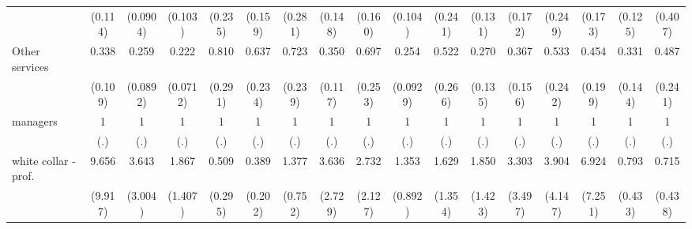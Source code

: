 {\begin{tabular}{l*{16}{c}}
                    &     (0.114)         &    (0.0904)         &     (0.103)         &     (0.235)         &     (0.159)         &     (0.281)         &     (0.148)         &     (0.160)         &     (0.104)         &     (0.241)         &     (0.131)         &     (0.172)         &     (0.249)         &     (0.173)         &     (0.125)         &     (0.407)         \\
[1em]
Other services      &       0.338\sym{***}&       0.259\sym{***}&       0.222\sym{***}&       0.810         &       0.637         &       0.723         &       0.350\sym{**} &       0.697         &       0.254\sym{***}&       0.522         &       0.270\sym{**} &       0.367\sym{*}  &       0.533         &       0.454         &       0.331\sym{*}  &       0.487         \\
                    &     (0.109)         &    (0.0892)         &    (0.0712)         &     (0.291)         &     (0.234)         &     (0.239)         &     (0.117)         &     (0.253)         &    (0.0929)         &     (0.266)         &     (0.135)         &     (0.156)         &     (0.242)         &     (0.199)         &     (0.144)         &     (0.241)         \\
[1em]
managers            &           1         &           1         &           1         &           1         &           1         &           1         &           1         &           1         &           1         &           1         &           1         &           1         &           1         &           1         &           1         &           1         \\
                    &         (.)         &         (.)         &         (.)         &         (.)         &         (.)         &         (.)         &         (.)         &         (.)         &         (.)         &         (.)         &         (.)         &         (.)         &         (.)         &         (.)         &         (.)         &         (.)         \\
[1em]
white collar - prof.&       9.656\sym{*}  &       3.643         &       1.867         &       0.509         &       0.389         &       1.377         &       3.636         &       2.732         &       1.353         &       1.629         &       1.850         &       3.303         &       3.904         &       6.924         &       0.793         &       0.715         \\
                    &     (9.917)         &     (3.004)         &     (1.407)         &     (0.295)         &     (0.202)         &     (0.752)         &     (2.729)         &     (2.127)         &     (0.892)         &     (1.354)         &     (1.423)         &     (3.497)         &     (4.147)         &     (7.251)         &     (0.433)         &     (0.438)         \\

\end{tabular}}
